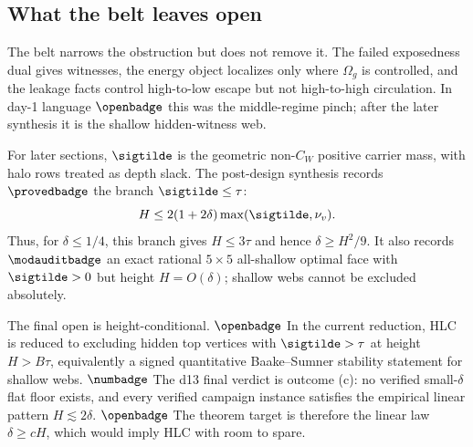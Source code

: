 \noindent{}

\subsection{What the belt leaves open}

The belt narrows the obstruction but does not remove it.  The failed
exposedness dual gives witnesses, the energy object localizes only where
\(\Omega_g\) is controlled, and the leakage facts control high-to-low
escape but not high-to-high circulation.  In day-1 language
\(\openbadge\) this was the middle-regime pinch; after the later synthesis
it is the shallow hidden-witness web.

For later sections, \(\sigtilde\) is the geometric non-\(C_W\) positive
carrier mass, with halo rows treated as depth slack.  The post-design
synthesis records \(\provedbadge\) the branch \(\sigtilde\le\tau\):
\[
        H\le 2(1+2\delta)\max(\sigtilde,\nu_v).
\]
Thus, for \(\delta\le 1/4\), this branch gives \(H\le 3\tau\) and hence
\(\delta\ge H^2/9\).  It also records \(\modauditbadge\) an exact
rational \(5\times5\) all-shallow optimal face with \(\sigtilde>0\) but
height \(H=O(\delta)\); shallow webs cannot be excluded absolutely.

The final open is height-conditional.  \(\openbadge\) In the current
reduction, HLC is reduced to excluding hidden top vertices with
\(\sigtilde>\tau\) at height \(H>B\tau\), equivalently a signed
quantitative Baake--Sumner stability statement for shallow webs.
\(\numbadge\) The d13 final verdict is outcome (c): no verified
small-\(\delta\) flat floor exists, and every verified campaign instance
satisfies the empirical linear pattern \(H\lesssim 2\delta\).
\(\openbadge\) The theorem target is therefore the linear law
\(\delta\ge cH\), which would imply HLC with room to spare.
